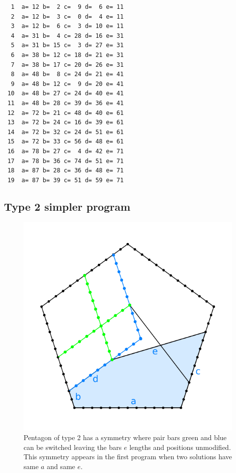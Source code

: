 \documentclass[11pt]{article}
\begin{document}
\begin{lstlisting}
  1  a= 12 b=  2 c=  9 d=  6 e= 11
  2  a= 12 b=  3 c=  0 d=  4 e= 11
  3  a= 12 b=  6 c=  3 d= 10 e= 11
  4  a= 31 b=  4 c= 28 d= 16 e= 31
  5  a= 31 b= 15 c=  3 d= 27 e= 31
  6  a= 38 b= 12 c= 18 d= 21 e= 31
  7  a= 38 b= 17 c= 20 d= 26 e= 31
  8  a= 48 b=  8 c= 24 d= 21 e= 41
  9  a= 48 b= 12 c=  9 d= 20 e= 41
 10  a= 48 b= 27 c= 24 d= 40 e= 41
 11  a= 48 b= 28 c= 39 d= 36 e= 41
 12  a= 72 b= 21 c= 48 d= 40 e= 61
 13  a= 72 b= 24 c= 16 d= 39 e= 61
 14  a= 72 b= 32 c= 24 d= 51 e= 61
 15  a= 72 b= 33 c= 56 d= 48 e= 61
 16  a= 78 b= 27 c=  4 d= 42 e= 71
 17  a= 78 b= 36 c= 74 d= 51 e= 71
 18  a= 87 b= 28 c= 36 d= 48 e= 71
 19  a= 87 b= 39 c= 51 d= 59 e= 71
\end{lstlisting}


\subsection{Type 2 simpler program}

\begin{figure}[htpb]
\centering
\includegraphics[scale=0.75]{figs/type-2-double}
\caption{Pentagon of type 2 has a symmetry where pair bars green and blue can be switched leaving
the bars $e$ lengths and positions unmodified. This symmetry appears in the first program when two solutions have same $a$ and same $e$.}
\label{fig:type-2-double}
\end{figure}
\end{document}
